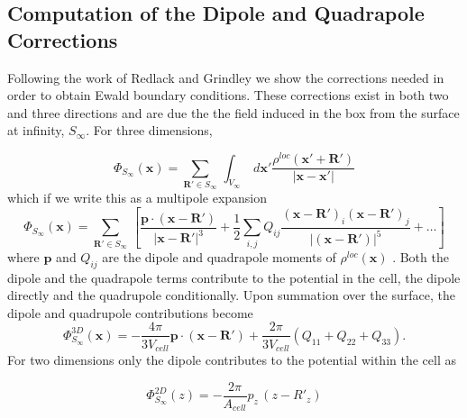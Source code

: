 \commentoutA{\documentclass[prb,aps,twocolumn,showpacs,twocolumngrid,superbib]{revtex4}}
\begin{document}
\subsection*{Computation of the Dipole and Quadrapole Corrections }

Following the work of Redlack and Grindley \cite{Redlack72} we show
the corrections needed in order to obtain Ewald boundary conditions.
These corrections exist in both two and three directions and are due
the the field induced in the box from the surface at infinity, \( S_{\infty } \).
For three dimensions, 

\begin{equation}
\label{D1}
\Phi _{S_{\infty }}({\mathbf{x}})=\sum _{{\mathbf{R}'}\in S_{\infty }}\, \int _{V_{\infty }}\: d{\mathbf{x}'}\frac{\rho ^{loc}\left( {\mathbf{x}'+\mathbf{R}'}\right) }{\left| \mathbf{x}-\mathbf{x}'\right| }
\end{equation}
which if we write this as a multipole expansion\begin{equation}
\label{D2}
\Phi _{S_{\infty }}({\mathbf{x}})=\sum _{{\mathbf{R}'}\in S_{\infty }}\, \left[ \frac{{\mathbf{p}}\cdot \left( {\mathbf{x}-\mathbf{R}'}\right) }{\left| {\mathbf{x}-\mathbf{R}'}\right| ^{3}}+\frac{1}{2}\sum _{i,j}Q_{ij}\frac{\left( {\mathbf{x}-\mathbf{R}'}\right) _{i}\left( {\mathbf{x}-\mathbf{R}'}\right) _{j}}{\left| \left( {\mathbf{x}-\mathbf{R}'}\right) \right| ^{5}}+\ldots \right] 
\end{equation}
where \( {\mathbf{p}} \) and \( Q_{ij} \) are the dipole and quadrapole
moments of \( \rho ^{loc}\left( {\mathbf{x}}\right)  \) . Both the
dipole and the quadrapole terms contribute to the potential in the
cell, the dipole directly and the quadrupole conditionally. Upon summation
over the surface, the dipole and quadrupole contributions become\begin{equation}
\label{D3}
\Phi ^{3D}_{S_{\infty }}({\mathbf{x}})=-\frac{4\pi }{3V_{cell}}{\mathbf{p}}\cdot \left( {\mathbf{x}-\mathbf{R}'}\right) +\frac{2\pi }{3V_{cell}}\left( Q_{11}+Q_{22}+Q_{33}\right) .
\end{equation}
For two dimensions only the dipole contributes to the potential within
the cell as

\begin{equation}
\label{D4}
\Phi ^{2D}_{S_{\infty }}(z)=-\frac{2\pi }{A_{cell}}p_{z}\, \left( z-R'_{z}\right) 
\end{equation}


\eject
\end{document}
